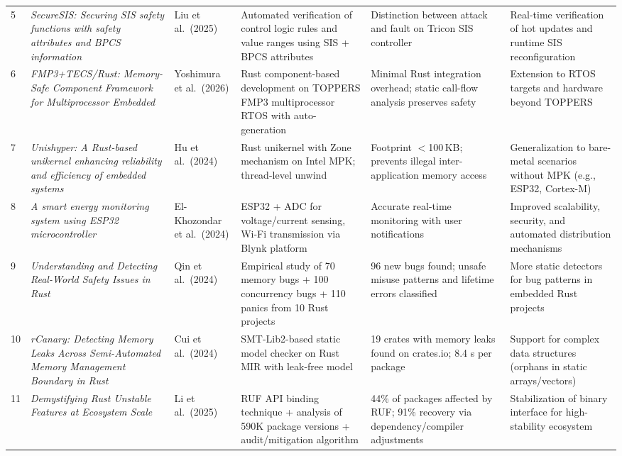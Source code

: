 \documentclass[11pt,a4paper]{article}
\begin{document}
\begin{longtable}{@{}p{0.4cm} p{3.2cm} p{2.4cm} p{3.2cm} p{2.8cm} p{2.6cm}@{}}
5 & \textit{SecureSIS: Securing SIS safety functions with safety attributes and BPCS information} & Liu et al.\ (2025) & Automated verification of control logic rules and value ranges using SIS + BPCS attributes & Distinction between attack and fault on Tricon SIS controller & Real-time verification of hot updates and runtime SIS reconfiguration\\

6 & \textit{FMP3+TECS/Rust: Memory-Safe Component Framework for Multiprocessor Embedded} & Yoshimura et al.\ (2026) & Rust component-based development on TOPPERS FMP3 multiprocessor RTOS with auto-generation & Minimal Rust integration overhead; static call-flow analysis preserves safety & Extension to RTOS targets and hardware beyond TOPPERS\\

7 & \textit{Unishyper: A Rust-based unikernel enhancing reliability and efficiency of embedded systems} & Hu et al.\ (2024) & Rust unikernel with Zone mechanism on Intel MPK; thread-level unwind & Footprint $<$100\,KB; prevents illegal inter-application memory access & Generalization to bare-metal scenarios without MPK (e.g., ESP32, Cortex-M)\\

8 & \textit{A smart energy monitoring system using ESP32 microcontroller} & El-Khozondar et al.\ (2024) & ESP32 + ADC for voltage/current sensing, Wi-Fi transmission via Blynk platform & Accurate real-time monitoring with user notifications & Improved scalability, security, and automated distribution mechanisms\\

9 & \textit{Understanding and Detecting Real-World Safety Issues in Rust} & Qin et al.\ (2024) & Empirical study of 70 memory bugs + 100 concurrency bugs + 110 panics from 10 Rust projects & 96 new bugs found; unsafe misuse patterns and lifetime errors classified & More static detectors for bug patterns in embedded Rust projects\\

10 & \textit{rCanary: Detecting Memory Leaks Across Semi-Automated Memory Management Boundary in Rust} & Cui et al.\ (2024) & SMT-Lib2-based static model checker on Rust MIR with leak-free model & 19 crates with memory leaks found on crates.io; 8.4 s per package & Support for complex data structures (orphans in static arrays/vectors)\\

11 & \textit{Demystifying Rust Unstable Features at Ecosystem Scale} & Li et al.\ (2025) & RUF API binding technique + analysis of 590K package versions + audit/mitigation algorithm & 44\% of packages affected by RUF; 91\% recovery via dependency/compiler adjustments & Stabilization of binary interface for high-stability ecosystem\\


\end{longtable}
\end{document}
